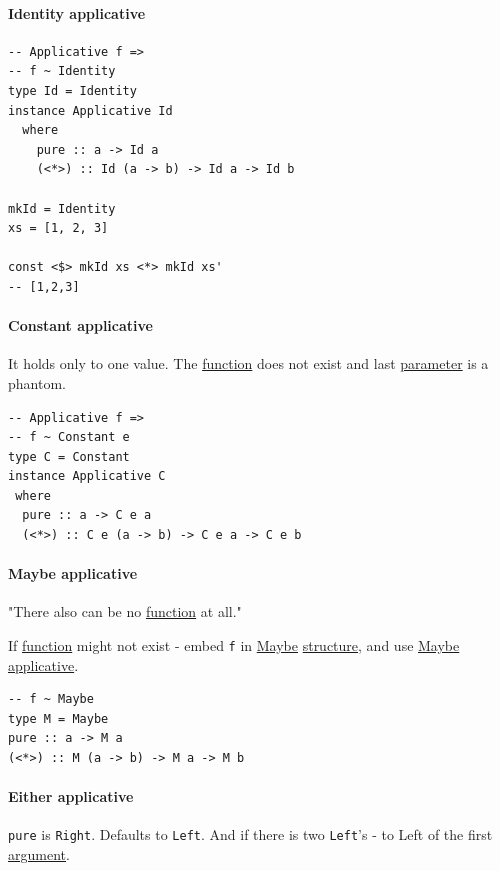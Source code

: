 \documentclass[a4paper,14pt,oneside]{book}
\begin{document}
\paragraph{\label{orgaa98eaf}Identity applicative}
\label{sec:org6de62b2}
\begin{verbatim}
-- Applicative f =>
-- f ~ Identity
type Id = Identity
instance Applicative Id
  where
    pure :: a -> Id a
    (<*>) :: Id (a -> b) -> Id a -> Id b

mkId = Identity
xs = [1, 2, 3]

const <$> mkId xs <*> mkId xs'
-- [1,2,3]
\end{verbatim}

\paragraph{\label{org1d783f7}Constant applicative}
\label{sec:orgbcf67bb}
It holds only to one value. The \hyperref[org50bbe06]{function} does not exist and last \hyperref[org022cfa5]{parameter} is a phantom.
\begin{verbatim}
-- Applicative f =>
-- f ~ Constant e
type C = Constant
instance Applicative C
 where
  pure :: a -> C e a
  (<*>) :: C e (a -> b) -> C e a -> C e b
\end{verbatim}

\paragraph{\label{org8459870}Maybe applicative}
\label{sec:orgf9b9722}
"There also can be no \hyperref[org50bbe06]{function} at all."

If \hyperref[org50bbe06]{function} might not exist - embed \texttt{f} in \hyperref[org6553a85]{Maybe} \hyperref[org156091f]{structure}, and use \hyperref[org6553a85]{Maybe} \hyperref[orge473e43]{applicative}.
\begin{verbatim}
-- f ~ Maybe
type M = Maybe
pure :: a -> M a
(<*>) :: M (a -> b) -> M a -> M b
\end{verbatim}

\paragraph{\label{orgf1029fd}Either applicative}
\label{sec:orgab6218f}
\texttt{pure} is \texttt{Right}.
Defaults to \texttt{Left}.
And if there is two \texttt{Left}'s - to Left of the first \hyperref[org60a0fa7]{argument}.
\end{document}
